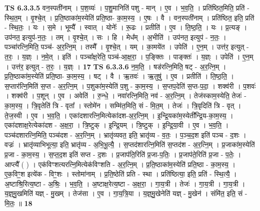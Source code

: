 \documentclass[17pt]{extarticle}
\begin{document}
                  \newline
                                \textbf{ TS 6.3.3.5} \newline
                  वन॒स्पती॑नाम् । प॒श॒व्यः॑ । प॒शु॒मानिति॑ पशु - मान् । ए॒व । भ॒व॒ति॒ । प्रति॑ष्ठित॒मिति॒ प्रति॑ - स्थि॒त॒म् । वृ॒श्चे॒त् । प्र॒ति॒ष्ठाका॑म॒स्येति॑ प्रति॒ष्ठा- का॒म॒स्य॒ । ए॒षः । वै । वन॒स्पती॑नाम् । प्रति॑ष्ठित॒ इति॒ प्रति॑ - स्थि॒तः॒ । यः । स॒मे । भूम्यै᳚ । स्वात् । योनेः᳚ । रू॒ढः । प्रतीति॑ । ए॒व । ति॒ष्ठ॒ति॒ । यः । प्र॒त्यङ् । उप॑नत॒ इत्युप॑-न॒तः॒ । तम् । वृ॒श्चे॒त् । सः । हि । मेध᳚म् । अ॒भीति॑ । उप॑नत॒ इत्युप॑ - न॒तः॒ । पञ्चा॑रत्नि॒मिति॒ पञ्च॑- अ॒र॒त्नि॒म् । तस्मै᳚ । वृ॒श्चे॒त् । यम् । का॒मये॑त । उपेति॑ । ए॒न॒म् । उत्त॑र॒ इत्युत् - त॒रः॒ । य॒ज्ञ्ः । न॒मे॒त् । इति॑ । पञ्चा᳚क्ष॒रेति॒ पञ्च॑-आ॒क्ष॒रा॒ । प॒ङ्क्तिः । पाङ्क्तः॑ । य॒ज्ञ्ः । उपेति॑ । ए॒न॒म् । उत्त॑र॒ इत्युत् - त॒रः॒ । य॒ज्ञ्ः । \textbf{  17} \newline
                  \newline
                                \textbf{ TS 6.3.3.6} \newline
                  न॒म॒ति॒ । षड॑रत्नि॒मिति॒ षट् - अ॒र॒त्नि॒म् । प्र॒ति॒ष्ठाका॑म॒स्येति॑ प्रति॒ष्ठा- का॒म॒स्य॒ । षट् । वै । ऋ॒तवः॑ । ऋ॒तुषु॑ । ए॒व । प्रतीति॑ । ति॒ष्ठ॒ति॒ । स॒प्तार॑त्नि॒मिति॑ स॒प्त - अ॒र॒त्नि॒म् । प॒शुका॑म॒स्येति॑ प॒शु - का॒म॒स्य॒ । स॒प्तप॒देति॑ स॒प्त-प॒दा॒ । शक्व॑री । प॒शवः॑ । शक्व॑री । प॒शून् । ए॒व । अवेति॑ । रु॒न्धे॒ । नवा॑रत्नि॒मिति॒ नव॑ - अ॒र॒त्नि॒म् । तेज॑स्काम॒स्येति॒ तेजः॑ - का॒म॒स्य॒ । त्रि॒वृतेति॑ त्रि - वृता᳚ । स्तोमे॑न । सम्मि॑त॒मिति॒ सं - मि॒त॒म् । तेजः॑ । त्रि॒वृदिति॑ त्रि - वृत् । ते॒ज॒स्वी । ए॒व । भ॒व॒ति॒ । एका॑दशारत्नि॒मित्येका॑दश-अ॒र॒त्नि॒म् । इ॒न्द्रि॒यका॑म॒स्येती᳚न्द्रि॒य-का॒म॒स्य॒ । एका॑दशाक्ष॒रेत्येका॑दश - अ॒क्ष॒रा॒ । त्रि॒ष्टुक् । इ॒न्द्रि॒यम् । त्रि॒ष्टुक् । इ॒न्द्रि॒या॒वी । ए॒व । भ॒व॒ति॒ । पञ्च॑दशारत्नि॒मिति॒ पञ्च॑दश - अ॒र॒त्नि॒म् । भ्रातृ॑व्यवत॒ इति॒ भ्रातृ॑व्य - व॒तः॒ । प॒ञ्च॒द॒श इति॑ पञ्च - द॒शः । वज्रः॑ । भ्रातृ॑व्याभिभूत्या॒ इति॒ भ्रातृ॑व्य - अ॒भि॒भू॒त्यै॒ । स॒प्तद॑शारत्नि॒मिति॑ स॒प्तद॑श - अ॒र॒त्नि॒म् । प्र॒जाका॑म॒स्येति॑ प्र॒जा - का॒म॒स्य॒ । स॒प्त॒द॒श इति॑ सप्त - द॒शः । प्र॒जाप॑ति॒रिति॑ प्र॒जा-प॒तिः॒ । प्र॒जाप॑ते॒रिति॑ प्र॒जा - प॒तेः॒ । आप्त्यै᳚ ( ) । एक॑विꣳशत्यरत्नि॒मित्येक॑विꣳशति - अ॒र॒त्नि॒म् । प्र॒ति॒ष्ठाका॑म॒स्येति॑ प्रति॒ष्ठा - का॒म॒स्य॒ । ए॒क॒विꣳ॒॒श इत्ये॑क - विꣳ॒॒शः । स्तोमा॑नाम् । प्र॒ति॒ष्ठेति॑ प्रति - स्था । प्रति॑ष्ठित्या॒ इति॒ प्रति॑ - स्थि॒त्यै॒ । अ॒ष्टाश्रि॒रित्य॒ष्टा - अ॒श्रिः॒ । भ॒व॒ति॒ । अ॒ष्टाक्ष॒रेत्य॒ष्टा - अ॒क्ष॒रा॒ । गा॒य॒त्री । तेजः॑ । गा॒य॒त्री । गा॒य॒त्री । य॒ज्ञ्॒मु॒खमिति॑ यज्ञ् - मु॒खम् । तेज॑सा । ए॒व । गा॒य॒त्रि॒या । य॒ज्ञ्॒मु॒खेनेति॑ यज्ञ् - मु॒खेन॑ । संमि॑त॒ इति॒ सं - मि॒तः॒ ॥ \textbf{  18 } \newline
\end{document}
